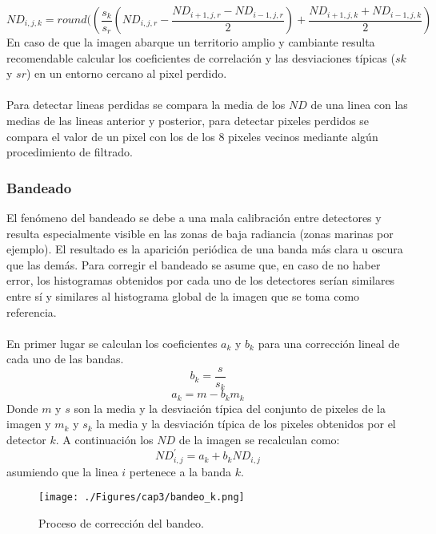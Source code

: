 		\begin{equation}
		ND_{i,j,k} = round((\dfrac{s_{k}}{s_{r}}(ND_{i,j,r}-\dfrac{ND_{i+1,j,r} - ND_{i-1,j,r}}{2}) + \dfrac{ND_{i+1,j,k} + ND_{i-1,j,k}}{2})
		\end{equation} 	
En caso de que la imagen abarque un territorio amplio y cambiante resulta recomendable calcular los coeficientes de correlaci\'on y las desviaciones t\'ipicas ($ sk $ y $ sr $) en un entorno cercano al pixel perdido.\\~\\
Para detectar lineas perdidas se compara la media de los $ ND $ de una linea con las medias de las lineas anterior y posterior, para detectar pixeles perdidos se compara el valor de un pixel con los de los 8 pixeles vecinos mediante alg\'un procedimiento de filtrado.
\subsubsection{Bandeado}\label{subsec:bandeado}
El fen\'omeno del bandeado se debe a una mala calibraci\'on entre detectores y resulta especialmente visible en las zonas de baja radiancia (zonas marinas por ejemplo). El resultado es la aparici\'on peri\'odica de una banda m\'as clara u oscura que las dem\'as.
Para corregir el bandeado se asume que, en caso de no haber error, los histogramas obtenidos por cada uno de los detectores ser\'ian similares entre s\'i y similares al histograma global de la imagen que se toma como referencia.\\~\\
En primer lugar se calculan los coeficientes $ a_{k} $ y $ b_{k} $ para una correcci\'on lineal de cada uno de las bandas.
		\begin{equation}
		b_{k}=\dfrac{s}{s_{k}}
		\end{equation} 	
				\begin{equation}
				a_{k}=m - b_{k}m_{k}
				\end{equation} 	
Donde $ m $ y $ s $ son la media y la desviaci\'on t\'ipica del conjunto de pixeles de la imagen y $ m_{k} $ y $ s_{k} $ la media
y la desviaci\'on t\'ipica de los pixeles obtenidos por el detector $ k $. A continuaci\'on los $ ND $ de la imagen se recalculan como:
				\begin{equation}
				ND_{i,j}^{'} = a_{k}+b_{k}ND_{i,j}
				\end{equation} 	
asumiendo que la linea $ i $ pertenece a la banda $ k $.				

    \begin{figure}[H]
    	\centering
    	\texttt{[image: ./Figures/cap3/bandeo\_k.png]}
    	\caption{Proceso de correcci\'on del bandeo.}
    	\label{fig:bandeado}
    \end{figure}

